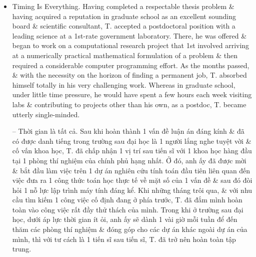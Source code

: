 \documentclass{article}
\begin{document}
\begin{enumerate}
\begin{itemize}
\begin{itemize}
			-- Kết quả tuyệt vời từ sự hướng dẫn của C. là cuối cùng tôi đã học được ý nghĩa của việc trở thành 1 nhà khoa học. Khi làm cho công việc của mình có ý nghĩa với người khác, tôi cũng đã làm cho nó trở nên hấp dẫn đối với chính mình. Tôi không còn chỉ làm việc trên các vấn đề của người khác nữa. Tôi là 1 phần của 1 doanh nghiệp trí tuệ với các mục tiêu được xác định tương đối rõ ràng, điều này thực sự có thể tạo ra sự khác biệt cho nhân loại. Tôi đã loại bỏ hầu hết các phương trình mà tôi đã lên kế hoạch trình bày \& tập trung lại bài nói chuyện của mình bằng cách sử dụng tài liệu chuyên đề mà tôi đã thu thập được từ C. Tôi đã có 1 buổi hội thảo tuyệt vời -- những người mà tôi hầu như không quen biết đã khen ngợi tôi sau đó về sự lựa chọn lĩnh vực nghiên cứu thú vị của tôi \& nhận xét về sự rõ ràng trong bài thuyết trình của tôi. Trong khoa học, sự củng cố không có gì tích cực hơn thế. Tôi đã học được 1 bài học quan trọng \& đang trên đường thực hiện.
			\item {\sf Timing Is Everything.} Having completed a respectable thesis problem \& having acquired a reputation in graduate school as an excellent sounding board \& scientific consultant, T. accepted a postdoctoral position with a leading science at a 1st-rate government laboratory. There, he was offered \& began to work on a computational research project that 1st involved arriving at a numerically practical mathematical formulation of a problem \& then required a considerable computer programming effort. As the months passed, \& with the necessity on the horizon of finding a permanent job, T. absorbed himself totally in his very challenging work. Whereas in graduate school, under little time pressure, he would have spent a few hours each week visiting labs \& contributing to projects other than his own, as a postdoc, T. became utterly single-minded.

			-- {\sf Thời gian là tất cả.} Sau khi hoàn thành 1 vấn đề luận án đáng kính \& đã có được danh tiếng trong trường sau đại học là 1 người lắng nghe tuyệt vời \& cố vấn khoa học, T. đã chấp nhận 1 vị trí sau tiến sĩ với 1 khoa học hàng đầu tại 1 phòng thí nghiệm của chính phủ hạng nhất. Ở đó, anh ấy đã được mời \& bắt đầu làm việc trên 1 dự án nghiên cứu tính toán đầu tiên liên quan đến việc đưa ra 1 công thức toán học thực tế về mặt số của 1 vấn đề \& sau đó đòi hỏi 1 nỗ lực lập trình máy tính đáng kể. Khi những tháng trôi qua, \& với nhu cầu tìm kiếm 1 công việc cố định đang ở phía trước, T. đã đắm mình hoàn toàn vào công việc rất đầy thử thách của mình. Trong khi ở trường sau đại học, dưới áp lực thời gian ít ỏi, anh ấy sẽ dành 1 vài giờ mỗi tuần để đến thăm các phòng thí nghiệm \& đóng góp cho các dự án khác ngoài dự án của mình, thì với tư cách là 1 tiến sĩ sau tiến sĩ, T. đã trở nên hoàn toàn tập trung.


\end{itemize}
\end{itemize}
\end{enumerate}
\end{document}
